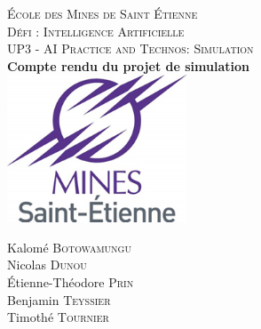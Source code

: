 \begin{titlepage}
	\begin{center}
		
		\textsc{\LARGE École des Mines de Saint Étienne}\\[2cm]
		
		\textsc{\Large Défi : Intelligence Artificielle}\\[1cm]
		\textsc{\Large UP3 - AI Practice and Technos: Simulation}\\[2cm]
		
		{ \huge \bfseries Compte rendu du projet de simulation}
		\\[1cm]
		\includegraphics[width=0.4\textwidth]{image/logo_mines.png}
		\\[2cm]
		
		\begin{minipage}{0.8\textwidth}
			\begin{flushleft} \large
				Kalomé \textsc{Botowamungu}\\[0.2cm]
				Nicolas \textsc{Dunou}\\[0.2cm]
				Étienne-Théodore \textsc{Prin}\\[0.2cm]
				Benjamin \textsc{Teyssier}\\[0.2cm]
				Timothé \textsc{Tournier}\\
			\end{flushleft}
		\end{minipage}
		
		\vfill
		
	\end{center}
\end{titlepage}
